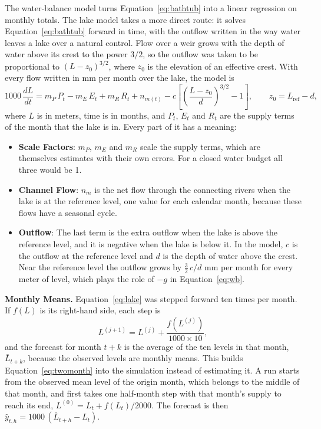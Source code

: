 \documentclass{article}
\begin{document}
The water-balance model turns Equation~\ref{eq:bathtub} into a linear regression on monthly
totals. The lake model takes a more direct route: it solves Equation~\ref{eq:bathtub} forward in
time, with the outflow written in the way water leaves a lake over a natural control. Flow over a
weir grows with the depth of water above its crest to the power $3/2$, so the outflow was taken
to be proportional to $(L - z_0)^{3/2}$, where $z_0$ is the elevation of an effective crest. With
every flow written in mm per month over the lake, the model is
\begin{equation}
1000\,\frac{dL}{dt} = m_P\,P_t - m_E\,E_t + m_R\,R_t + n_{m(t)}
- c\left[\left(\frac{L - z_0}{d}\right)^{3/2} - 1\right], \qquad z_0 = L_{\mathrm{ref}} - d,
\label{eq:lake}
\end{equation}
where $L$ is in meters, time is in months, and $P_t$, $E_t$ and $R_t$ are the supply terms of the
month that the lake is in. Every part of it has a meaning:
\begin{itemize}
\item \textbf{Scale Factors}: $m_P$, $m_E$ and $m_R$ scale the supply terms, which are themselves
estimates with their own errors. For a closed water budget all three would be 1.
\item \textbf{Channel Flow}: $n_m$ is the net flow through the connecting rivers when the lake is
at the reference level, one value for each calendar month, because these flows have a seasonal
cycle.
\item \textbf{Outflow}: The last term is the extra outflow when the lake is above the reference
level, and it is negative when the lake is below it. In the model, $c$ is the outflow at the
reference level and $d$ is the depth of water above the crest. Near the reference level the
outflow grows by $\tfrac{3}{2}\,c/d$ mm per month for every meter of level, which plays the role
of $-g$ in Equation~\ref{eq:wb}.
\end{itemize}

\textbf{Monthly Means.} Equation~\ref{eq:lake} was stepped forward ten times per month. If $f(L)$
is its right-hand side, each step is
\begin{equation}
L^{(j+1)} = L^{(j)} + \frac{f\!\left(L^{(j)}\right)}{1000 \times 10}, \label{eq:euler}
\end{equation}
and the forecast for month $t+k$ is the average of the ten levels in that month, $\bar L_{t+k}$,
because the observed levels are monthly means. This builds Equation~\ref{eq:twomonth} into the
simulation instead of estimating it. A run starts from the observed mean level of the origin
month, which belongs to the middle of that month, and first takes one half-month step with that
month's supply to reach its end, $L^{(0)} = L_t + f(L_t)/2000$. The forecast is then
$\hat y_{t,h} = 1000\,(\bar L_{t+h} - L_t)$.
\end{document}
